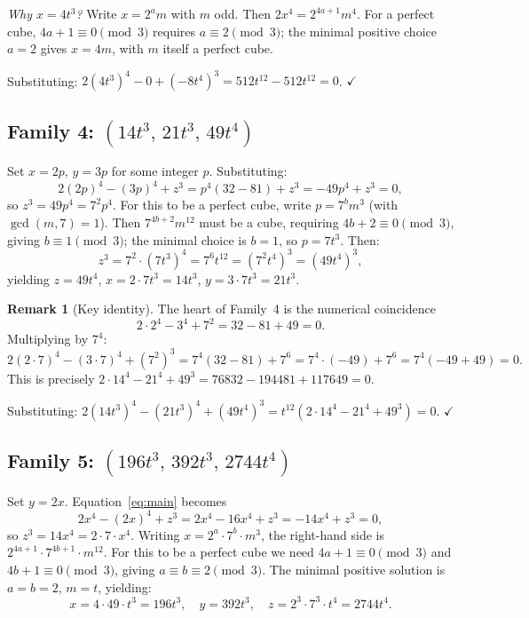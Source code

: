 \documentclass[12pt,a4paper]{article}
\theoremstyle{definition}
\newtheorem{remark}[theorem]{Remark}
\begin{document}
\noindent \textit{Why $x = 4t^3$?}\quad
Write $x = 2^a m$ with $m$ odd.  Then $2x^4 = 2^{4a+1} m^4$.  For a perfect cube,
$4a+1 \equiv 0 \pmod{3}$ requires $a \equiv 2 \pmod{3}$; the minimal positive choice
$a = 2$ gives $x = 4m$, with $m$ itself a perfect cube.

\noindent Substituting: $2(4t^3)^4 - 0 + (-8t^4)^3 = 512t^{12} - 512t^{12} = 0$. $\checkmark$

\subsection{Family 4: \texorpdfstring{$(14t^3,\, 21t^3,\, 49t^4)$}{(14t³,21t³,49t⁴)}}

Set $x = 2p$, $y = 3p$ for some integer $p$.  Substituting:
\[
  2(2p)^4 - (3p)^4 + z^3 = p^4(32 - 81) + z^3 = -49p^4 + z^3 = 0,
\]
so $z^3 = 49p^4 = 7^2 p^4$.  For this to be a perfect cube, write $p = 7^b m^3$
(with $\gcd(m, 7) = 1$).  Then $7^{4b+2} m^{12}$ must be a cube, requiring
$4b + 2 \equiv 0 \pmod{3}$, giving $b \equiv 1 \pmod{3}$; the minimal choice is $b = 1$,
so $p = 7t^3$.  Then:
\[
  z^3 = 7^2 \cdot (7t^3)^4 = 7^6 t^{12} = (7^2 t^4)^3 = (49t^4)^3,
\]
yielding $z = 49t^4$, $x = 2 \cdot 7t^3 = 14t^3$, $y = 3 \cdot 7t^3 = 21t^3$.

\begin{remark}[Key identity]
  The heart of Family~4 is the numerical coincidence
  \[
    2 \cdot 2^4 - 3^4 + 7^2 = 32 - 81 + 49 = 0.
  \]
  Multiplying by $7^4$:
  \[
    2(2\cdot 7)^4 - (3\cdot 7)^4 + (7^2)^3
    = 7^4(32 - 81) + 7^6
    = 7^4 \cdot (-49) + 7^6
    = 7^4(-49 + 49) = 0.
  \]
  This is precisely $2\cdot 14^4 - 21^4 + 49^3 = 76832 - 194481 + 117649 = 0$.
\end{remark}

\noindent Substituting: $2(14t^3)^4 - (21t^3)^4 + (49t^4)^3 = t^{12}(2\cdot 14^4 - 21^4 + 49^3) = 0$. $\checkmark$

\subsection{Family 5: \texorpdfstring{$(196t^3,\, 392t^3,\, 2744t^4)$}{(196t³,392t³,2744t⁴)}}

Set $y = 2x$.  Equation~\eqref{eq:main} becomes
\[
  2x^4 - (2x)^4 + z^3 = 2x^4 - 16x^4 + z^3 = -14x^4 + z^3 = 0,
\]
so $z^3 = 14x^4 = 2\cdot 7\cdot x^4$.  Writing $x = 2^a\cdot 7^b\cdot m^3$, the
right-hand side is $2^{4a+1}\cdot 7^{4b+1}\cdot m^{12}$.  For this to be a perfect
cube we need $4a+1\equiv 0\pmod 3$ and $4b+1\equiv 0\pmod 3$, giving $a\equiv b\equiv 2\pmod 3$.
The minimal positive solution is $a=b=2$, $m=t$, yielding:
\[
  x = 4\cdot 49\cdot t^3 = 196t^3,\quad
  y = 392t^3,\quad
  z = 2^3 \cdot 7^3 \cdot t^4 = 2744t^4.
\]
\end{document}
